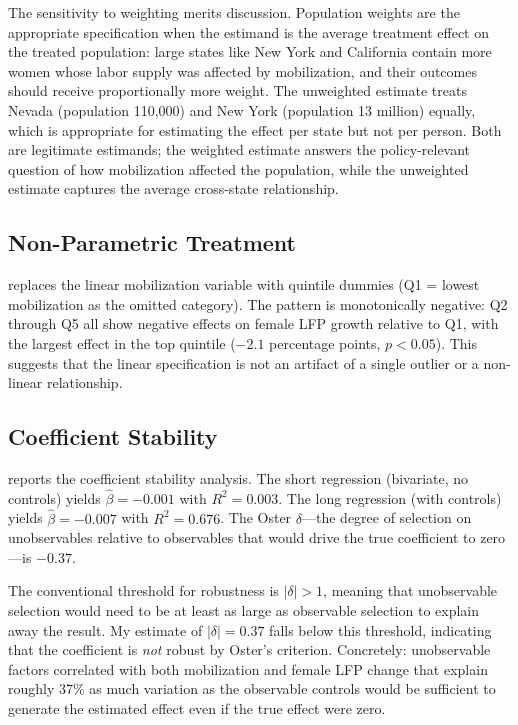 \documentclass[12pt]{article}
\begin{document}
The sensitivity to weighting merits discussion. Population weights are the appropriate specification when the estimand is the average treatment effect on the treated population: large states like New York and California contain more women whose labor supply was affected by mobilization, and their outcomes should receive proportionally more weight. The unweighted estimate treats Nevada (population 110,000) and New York (population 13 million) equally, which is appropriate for estimating the effect per state but not per person. Both are legitimate estimands; the weighted estimate answers the policy-relevant question of how mobilization affected the population, while the unweighted estimate captures the average cross-state relationship.



\subsection{Non-Parametric Treatment}

 replaces the linear mobilization variable with quintile dummies (Q1 = lowest mobilization as the omitted category). The pattern is monotonically negative: Q2 through Q5 all show negative effects on female LFP growth relative to Q1, with the largest effect in the top quintile ($-2.1$ percentage points, $p < 0.05$). This suggests that the linear specification is not an artifact of a single outlier or a non-linear relationship.



\subsection{Coefficient Stability}

 reports the \citet{oster2019unobservable} coefficient stability analysis. The short regression (bivariate, no controls) yields $\hat{\beta} = -0.001$ with $R^2 = 0.003$. The long regression (with controls) yields $\hat{\beta} = -0.007$ with $R^2 = 0.676$. The Oster $\delta$---the degree of selection on unobservables relative to observables that would drive the true coefficient to zero---is $-0.37$.

The conventional threshold for robustness is $|\delta| > 1$, meaning that unobservable selection would need to be at least as large as observable selection to explain away the result. My estimate of $|\delta| = 0.37$ falls below this threshold, indicating that the coefficient is \textit{not} robust by Oster's criterion. Concretely: unobservable factors correlated with both mobilization and female LFP change that explain roughly 37\% as much variation as the observable controls would be sufficient to generate the estimated effect even if the true effect were zero.
\end{document}
